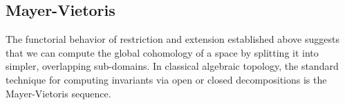 \documentclass[../../main]{subfiles}
\begin{document}

\subsection{Mayer-Vietoris}

The functorial behavior of restriction and extension established above suggests that we can compute the global cohomology of a space by splitting it into simpler, overlapping sub-domains.
In classical algebraic topology, the standard technique for computing invariants via open or closed decompositions is the Mayer-Vietoris sequence.
\end{document}
